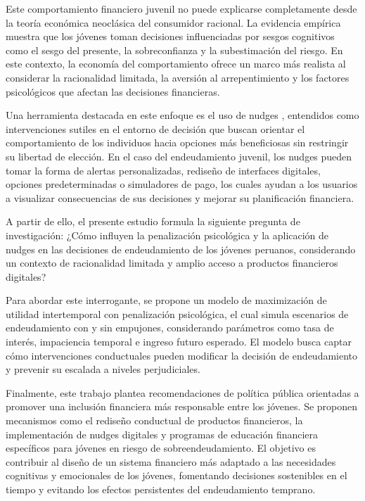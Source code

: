 \documentclass[10pt]{article}
\begin{document}
\begin{multicols}{2}
Este comportamiento financiero juvenil no puede explicarse completamente desde la teoría económica neoclásica del consumidor racional. La evidencia empírica muestra que los jóvenes toman decisiones influenciadas por sesgos cognitivos como el sesgo del presente, la sobreconfianza y la subestimación del riesgo. En este contexto, la economía del comportamiento ofrece un marco más realista al considerar la racionalidad limitada, la aversión al arrepentimiento y los factores psicológicos que afectan las decisiones financieras.

Una herramienta destacada en este enfoque es el uso de nudges , entendidos como intervenciones sutiles en el entorno de decisión que buscan orientar el comportamiento de los individuos hacia opciones más beneficiosas sin restringir su libertad de elección. En el caso del endeudamiento juvenil, los nudges pueden tomar la forma de alertas personalizadas, rediseño de interfaces digitales, opciones predeterminadas o simuladores de pago, los cuales ayudan a los usuarios a visualizar consecuencias de sus decisiones y mejorar su planificación financiera.

A partir de ello, el presente estudio formula la siguiente pregunta de investigación:
¿Cómo influyen la penalización psicológica y la aplicación de nudges en las decisiones de endeudamiento de los jóvenes peruanos, considerando un contexto de racionalidad limitada y amplio acceso a productos financieros digitales?

Para abordar este interrogante, se propone un modelo de maximización de utilidad intertemporal con penalización psicológica, el cual simula escenarios de endeudamiento con y sin empujones, considerando parámetros como tasa de interés, impaciencia temporal e ingreso futuro esperado. El modelo busca captar cómo intervenciones conductuales pueden modificar la decisión de endeudamiento y prevenir su escalada a niveles perjudiciales.

Finalmente, este trabajo plantea recomendaciones de política pública orientadas a promover una inclusión financiera más responsable entre los jóvenes. Se proponen mecanismos como el rediseño conductual de productos financieros, la implementación de nudges digitales y programas de educación financiera específicos para jóvenes en riesgo de sobreendeudamiento. El objetivo es contribuir al diseño de un sistema financiero más adaptado a las necesidades cognitivas y emocionales de los jóvenes, fomentando decisiones sostenibles en el tiempo y evitando los efectos persistentes del endeudamiento temprano.



\end{multicols}
\end{document}
